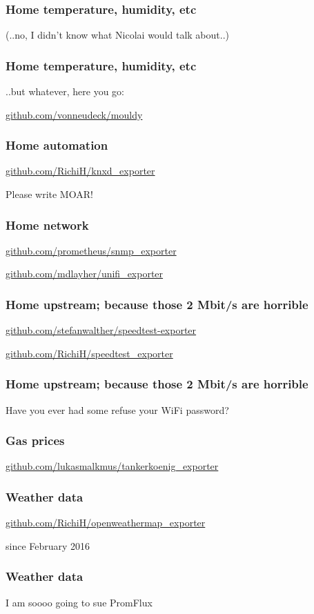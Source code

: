 \documentclass[t]{beamer}
\begin{document}
\begin{frame}
	\frametitle{Home temperature, humidity, etc}
	\vfill
	\centerline{(..no, I didn't know what Nicolai would talk about..)}
	\vfill
\end{frame}

\begin{frame}
	\frametitle{Home temperature, humidity, etc}
	\vfill
	\centerline{..but whatever, here you go:}
	\vfill
	\centerline{\url{github.com/vonneudeck/mouldy}}
	\vfill
\end{frame}

\begin{frame}
	\frametitle{Home automation}
	\vfill
	\centerline{\url{github.com/RichiH/knxd_exporter}}
	\vfill
	\centerline{Please write MOAR!}
	\vfill
\end{frame}

\begin{frame}
	\frametitle{Home network}
	\vfill
	\centerline{\url{github.com/prometheus/snmp_exporter}}
	\vfill
	\centerline{\url{github.com/mdlayher/unifi_exporter}}
	\vfill
\end{frame}

\begin{frame}
	\frametitle{Home upstream; because those 2 Mbit/s are horrible}
	\vfill
	\centerline{\url{github.com/stefanwalther/speedtest-exporter}}
	\vfill
	\centerline{\url{github.com/RichiH/speedtest_exporter}}
	\vfill
\end{frame}

\begin{frame}
	\frametitle{Home upstream; because those 2 Mbit/s are horrible}
	\vfill
	\centerline{Have you ever had some refuse your WiFi password?}
	\vfill
\end{frame}

\begin{frame}
	\frametitle{Gas prices}
	\vfill
	\centerline{\url{github.com/lukasmalkmus/tankerkoenig_exporter}}
	\vfill
\end{frame}

\begin{frame}
	\frametitle{Weather data}
	\vfill
	\centerline{\url{github.com/RichiH/openweathermap_exporter}}
	\vfill
	\centerline{since February 2016}
	\vfill
\end{frame}

\begin{frame}
	\frametitle{Weather data}
	\vfill
	\centerline{I am soooo going to sue PromFlux}
	\vfill
\end{frame}
\end{document}
